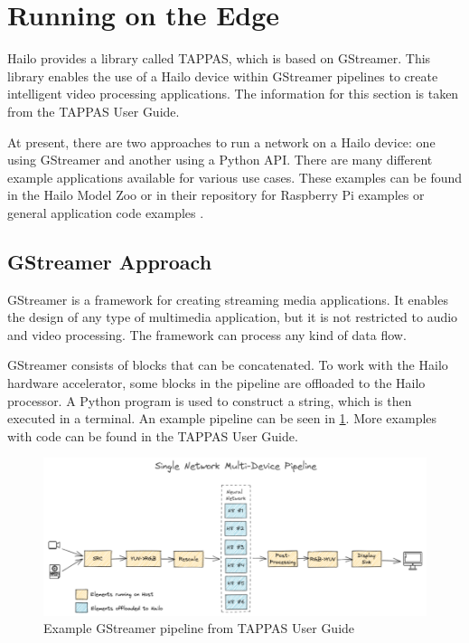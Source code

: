 \section{Running on the Edge}

Hailo provides a library called TAPPAS, which is based on GStreamer.  
This library enables the use of a Hailo device within GStreamer pipelines to create intelligent video processing applications.  
The information for this section is taken from the TAPPAS User Guide.  

At present, there are two approaches to run a network on a Hailo device:  
one using GStreamer and another using a Python API.  
There are many different example applications available for various use cases.  
These examples can be found in the Hailo Model Zoo \cite{hailo_model_zoo} or in their repository for Raspberry Pi examples \cite{hailo_rpi5_examples} or general application code examples \cite{hailo_application_code_examples}.  

\subsection{GStreamer Approach}

GStreamer is a framework for creating streaming media applications.  
It enables the design of any type of multimedia application, but it is not restricted to audio and video processing.  
The framework can process any kind of data flow.  

GStreamer consists of blocks that can be concatenated.  
To work with the Hailo hardware accelerator, some blocks in the pipeline are offloaded to the Hailo processor.  
A Python program is used to construct a string, which is then executed in a terminal.  
An example pipeline can be seen in \cref{fig:hardware:gstreamerpipeline}.  
More examples with code can be found in the TAPPAS User Guide.

\begin{figure}[]
    \centering
    \includegraphics[width=\textwidth]{Images/Hardware/gstreamerExample.png}
    \caption{Example GStreamer pipeline from TAPPAS User Guide}
    \label{fig:hardware:gstreamerpipeline}
\end{figure}

